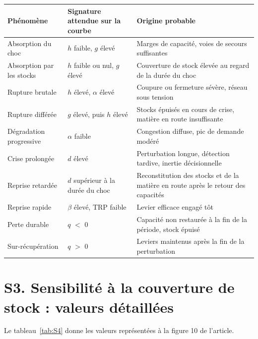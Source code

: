 \begin{center}\begin{minipage}{\textwidth}
\label{tab:S3}
\footnotesize
\begin{tabularx}{\textwidth}{@{}LLL@{}}
\toprule
\textbf{Phénomène} & \textbf{Signature attendue sur la courbe} & \textbf{Origine probable} \\
\midrule
Absorption du choc & $h$ faible, $g$ élevé & Marges de capacité, voies de secours suffisantes \\
Absorption par les stocks & $h$ faible ou nul, $g$ élevé & Couverture de stock élevée au regard de la durée du choc \\
Rupture brutale & $h$ élevé, $\alpha$ élevé & Coupure ou fermeture sévère, réseau sous tension \\
Rupture différée & $g$ élevé, puis $h$ élevé & Stocks épuisés en cours de crise, matière en route insuffisante \\
Dégradation progressive & $\alpha$ faible & Congestion diffuse, pic de demande modéré \\
Crise prolongée & $d$ élevé & Perturbation longue, détection tardive, inertie décisionnelle \\
Reprise retardée & $d$ supérieur à la durée du choc & Reconstitution des stocks et de la matière en route après le retour des capacités \\
Reprise rapide & $\beta$ élevé, TRP faible & Levier efficace engagé tôt \\
Perte durable & $q$ $<$ 0 & Capacité non restaurée à la fin de la période, stock épuisé \\
Sur-récupération & $q$ $>$ 0 & Leviers maintenus après la fin de la perturbation \\
\bottomrule
\end{tabularx}
\end{minipage}\end{center}

\section*{S3. Sensibilité à la couverture de stock : valeurs détaillées}

Le tableau~\ref{tab:S4} donne les valeurs représentées à la figure 10 de l'article.

